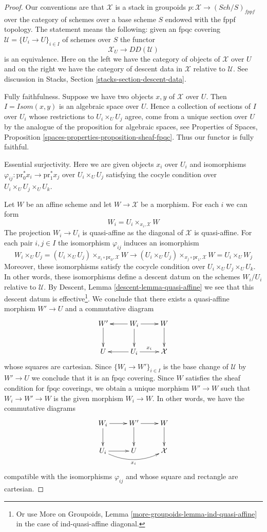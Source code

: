 \documentclass[10pt,a4paper]{amsart}
\theoremstyle{plain}
\theoremstyle{definition}
\theoremstyle{remark}
\numberwithin{equation}{subsection}
\def\Sch{\mathit{Sch}}
\begin{document}
\begin{proof}
Our conventions are that $\mathcal{X}$ is a stack
in groupoids $p : \mathcal{X} \to (\Sch/S)_{fppf}$
over the category of schemes over a base scheme $S$ endowed
with the fppf topology. The statement means the following:
given an fpqc covering $\mathcal{U} = \{U_i \to U\}_{i \in I}$
of schemes over $S$ the functor
$$
\mathcal{X}_U \longrightarrow DD(\mathcal{U})
$$
is an equivalence. Here on the left we have the category
of objects of $\mathcal{X}$ over $U$ and on the right we have
the category of descent data in $\mathcal{X}$ relative to $\mathcal{U}$.
See discussion in Stacks, Section \ref{stacks-section-descent-data}.

\medskip\noindent
Fully faithfulness. Suppose we have two objects $x, y$ of $\mathcal{X}$
over $U$. Then $I = \mathit{Isom}(x, y)$ is an algebraic space over $U$.
Hence a collection of sections of $I$ over $U_i$ whose restrictions
to $U_i \times_U U_j$ agree, come from a unique section over $U$ by
the analogue of the proposition for algebraic spaces, see
Properties of Spaces, Proposition
\ref{spaces-properties-proposition-sheaf-fpqc}.
Thus our functor is fully faithful.

\medskip\noindent
Essential surjectivity. Here we are given objects
$x_i$ over $U_i$ and isomorphisms
$\varphi_{ij} : \text{pr}_0^*x_i \to \text{pr}_1^*x_j$
over $U_i \times_U U_j$ satisfying the cocyle condition
over $U_i \times_U U_j \times_U U_k$.

\medskip\noindent
Let $W$ be an affine scheme and let $W \to \mathcal{X}$
be a morphism. For each $i$ we can form
$$
W_i = U_i \times_{x_i, \mathcal{X}} W
$$
The projection $W_i \to U_i$ is quasi-affine as the
diagonal of $\mathcal{X}$ is quasi-affine. For each pair
$i, j \in I$ the isomorphism $\varphi_{ij}$ induces
an isomorphism
$$
W_i \times_U U_j =
(U_i \times_U U_j) \times_{x_i \circ \text{pr}_0, \mathcal{X}} W
\to
(U_i \times_U U_j) \times_{x_j \circ \text{pr}_1, \mathcal{X}} W =
U_i \times_U W_j
$$
Moreover, these isomorphisms satisfy the cocycle condition over
$U_i \times_U U_j \times_U U_k$. In other words, these isomorphisms
define a descent datum on the schemes $W_i/U_i$ relative to $\mathcal{U}$.
By Descent, Lemma \ref{descent-lemma-quasi-affine}
we see that this descent datum is effective\footnote{Or use
More on Groupoids, Lemma \ref{more-groupoids-lemma-ind-quasi-affine}
in the case of ind-quasi-affine diagonal.}.
We conclude that there exists a quasi-affine morphism
$W' \to U$ and a commutative diagram
$$
\xymatrix{
W' \ar[d] &
W_i \ar[l] \ar[d] \ar[r] &
W \ar[d] \\
U &
U_i \ar[l] \ar[r]^{x_i} &
\mathcal{X}
}
$$
whose squares are cartesian. Since $\{W_i \to W'\}_{i \in I}$
is the base change of $\mathcal{U}$ by $W' \to U$ we conclude
that it is an fpqc covering. Since $W$ satisfies the sheaf
condition for fpqc coverings, we obtain a unique morphism
$W' \to W$ such that $W_i \to W' \to W$ is the given morphism
$W_i \to W$. In other words, we have the commutative diagrams
$$
\xymatrix{
W_i \ar[d] \ar[r] &
W' \ar[d] \ar[r] &
W \ar[d] \\
U_i \ar[r] \ar@/_1pc/[rr]_{x_i} &
U &
\mathcal{X}
}
$$
compatible with the isomorphisms $\varphi_{ij}$ and whose
square and rectangle are cartesian.


\end{proof}
\end{document}
